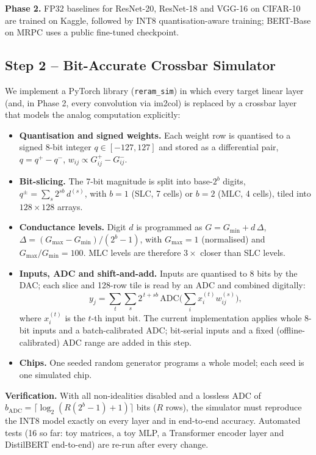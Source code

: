 \documentclass[10pt,a4paper]{article}
\begin{document}
\textbf{Phase 2.} FP32 baselines for ResNet-20, ResNet-18 and VGG-16 on CIFAR-10 are trained on Kaggle,
followed by INT8 quantisation-aware training; BERT-Base on MRPC uses a public fine-tuned checkpoint.

\subsection{Step 2 -- Bit-Accurate Crossbar Simulator}
We implement a PyTorch library (\texttt{reram\_sim}) in which every target linear layer (and, in
Phase 2, every convolution via im2col) is replaced by a crossbar layer that models the analog
computation explicitly:
\begin{itemize}
\item \textbf{Quantisation and signed weights.} Each weight row is quantised to a signed 8-bit integer
$q\in[-127,127]$ and stored as a differential pair, $q=q^{+}-q^{-}$, $w_{ij}\propto G^{+}_{ij}-G^{-}_{ij}$.
\item \textbf{Bit-slicing.} The 7-bit magnitude is split into base-$2^b$ digits,
$q^{\pm}=\sum_s 2^{sb}\,d^{(s)}$, with $b=1$ (SLC, 7 cells) or $b=2$ (MLC, 4 cells), tiled into
$128\times128$ arrays.
\item \textbf{Conductance levels.} Digit $d$ is programmed as $G=G_{\min}+d\,\Delta$,
$\Delta=(G_{\max}-G_{\min})/(2^b-1)$, with $G_{\max}=1$ (normalised) and $G_{\max}/G_{\min}=100$. MLC
levels are therefore $3\times$ closer than SLC levels.
\item \textbf{Inputs, ADC and shift-and-add.} Inputs are quantised to 8 bits by the DAC; each slice
and 128-row tile is read by an ADC and combined digitally:
\begin{equation}
y_j=\sum_t\sum_s 2^{\,t+sb}\,\mathrm{ADC}\!\Big(\sum_i x_i^{(t)} w_{ij}^{(s)}\Big),
\end{equation}
where $x_i^{(t)}$ is the $t$-th input bit. The current implementation applies whole 8-bit inputs and
a batch-calibrated ADC; bit-serial inputs and a fixed (offline-calibrated) ADC range are added in this
step.
\item \textbf{Chips.} One seeded random generator programs a whole model; each seed is one simulated chip.
\end{itemize}

\textbf{Verification.} With all non-idealities disabled and a lossless ADC of
$b_{\mathrm{ADC}}=\lceil\log_2(R(2^b-1)+1)\rceil$ bits ($R$ rows), the simulator must reproduce the INT8
model exactly on every layer and in end-to-end accuracy. Automated tests (16 so far: toy matrices, a toy
MLP, a Transformer encoder layer and DistilBERT end-to-end) are re-run after every change.
\end{document}
